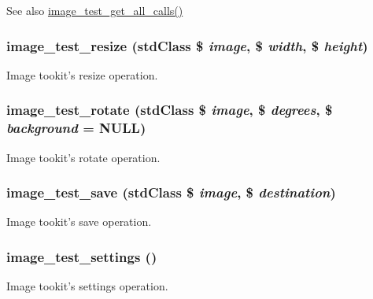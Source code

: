 \begin{DoxySeeAlso}{See also}
\hyperlink{image__test_8module_a3f28c9aa17b3a20708dbe6329f1f26f9}{image\_\-test\_\-get\_\-all\_\-calls()} 
\end{DoxySeeAlso}
\hypertarget{image__test_8module_a37dbf54501f682a348a35e651e934f99}{
\subsubsection[{image\_\-test\_\-resize}]{\setlength{\rightskip}{0pt plus 5cm}image\_\-test\_\-resize (stdClass \$ {\em image}, \/  \$ {\em width}, \/  \$ {\em height})}}
\label{image__test_8module_a37dbf54501f682a348a35e651e934f99}
Image tookit's resize operation. \hypertarget{image__test_8module_a53cdec44e6cce8926e3e67ee73490b34}{
\subsubsection[{image\_\-test\_\-rotate}]{\setlength{\rightskip}{0pt plus 5cm}image\_\-test\_\-rotate (stdClass \$ {\em image}, \/  \$ {\em degrees}, \/  \$ {\em background} = {\ttfamily NULL})}}
\label{image__test_8module_a53cdec44e6cce8926e3e67ee73490b34}
Image tookit's rotate operation. \hypertarget{image__test_8module_a233ff1e77ce386b8bd7c18ab6ba778ed}{
\subsubsection[{image\_\-test\_\-save}]{\setlength{\rightskip}{0pt plus 5cm}image\_\-test\_\-save (stdClass \$ {\em image}, \/  \$ {\em destination})}}
\label{image__test_8module_a233ff1e77ce386b8bd7c18ab6ba778ed}
Image tookit's save operation. \hypertarget{image__test_8module_a624f95685880e7e1a76bd8f5c8631525}{
\subsubsection[{image\_\-test\_\-settings}]{\setlength{\rightskip}{0pt plus 5cm}image\_\-test\_\-settings ()}}
\label{image__test_8module_a624f95685880e7e1a76bd8f5c8631525}
Image tookit's settings operation. 